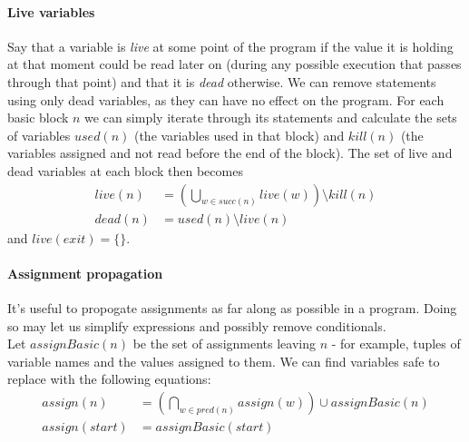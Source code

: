 \documentclass[12pt,a4paper]{article}
\begin{document}
\paragraph{Live variables}
 Say that a variable is \textit{live} at some point of the program if the value it is holding at that moment could be read later on (during any possible execution that passes through that point) and that it is \textit{dead} otherwise. We can remove statements using only dead variables,
as they can have no effect on the program. For each basic block $n$ we can simply iterate through its statements and calculate the sets of variables $used(n)$ (the variables used in that block) and $kill(n)$ (the variables
assigned and not read before the end of the block). The set of live and dead variables at each block then becomes
\begin{align*}
live(n)&= \left(\bigcup_{w\in succ(n)}live(w)\right) \setminus kill(n) \\
dead(n)&= used(n) \setminus live(n)
\end{align*}
and $live(exit) = \{\}$.

\paragraph{Assignment propagation}
It's useful to propogate assignments as far along as possible in a program. Doing so may let us simplify expressions and possibly remove conditionals.\\
Let $assignBasic(n)$ be the set of assignments leaving $n$ - for example, tuples of variable names and the values assigned to them. We can find variables safe to replace with the following equations:
\begin{align*}
assign(n)&= \left(\bigcap_{w\in pred(n)}assign(w)\right) \cup assignBasic(n) \\
assign(start)&= assignBasic(start)
\end{align*}
\end{document}
